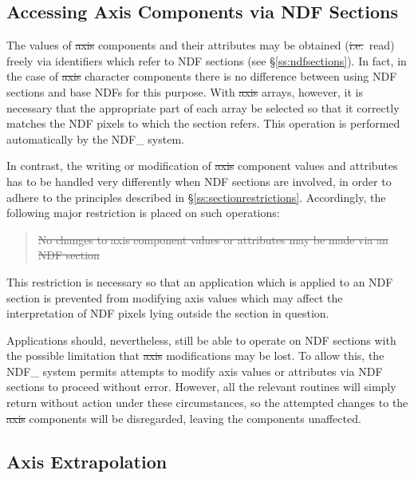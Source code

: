 \subsection{Accessing Axis Components via NDF Sections}

The values of \st{axis\/} components and their attributes may be obtained
(\st{i.e.}\ read) freely via identifiers which refer to NDF sections (see
\S\ref{ss:ndfsections}). 
In fact, in the case of \st{axis\/} character components there is no
difference between using NDF sections and base NDFs for this purpose. 
With \st{axis\/} arrays, however, it is necessary that the appropriate
part of each array be selected so that it correctly matches the NDF pixels
to which the section refers. 
This operation is performed automatically by the NDF\_ system.

In contrast, the writing or modification of \st{axis\/} component values
and attributes has to be handled very differently when NDF sections are
involved, in order to adhere to the principles described in
\S\ref{ss:sectionrestrictions}. 
Accordingly, the following major restriction is placed on such operations:

\begin{quote}
\begin{center}
\st{No changes to axis component values or attributes may be made via an 
NDF section}
\end{center}
\end{quote}

This restriction is necessary so that an application which is applied to an
NDF section is prevented from modifying axis values which may affect the
interpretation of NDF pixels lying outside the section in question. 

Applications should, nevertheless, still be able to operate on NDF sections
with the possible limitation that \st{axis\/} modifications may be lost. 
To allow this, the NDF\_ system permits attempts to modify axis values or
attributes via NDF sections to proceed without error. 
However, all the relevant routines will simply return without action under
these circumstances, so the attempted changes to the \st{axis\/} components
will be disregarded, leaving the components unaffected. 

\subsection{Axis Extrapolation}

